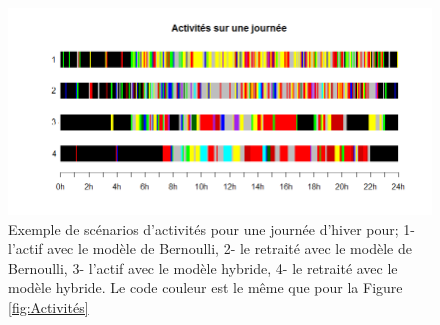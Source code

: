\begin{figure}[H]
\centering
\includegraphics[scale=0.7]{Images/Activites/ActivitesSurUneJournee}
\caption{Exemple de scénarios d'activités pour une journée d'hiver pour; 1- l'actif avec le modèle de Bernoulli, 2- le retraité avec le modèle de Bernoulli, 3- l'actif avec le modèle hybride, 4- le retraité avec le modèle hybride. Le code couleur est le même que pour la Figure \ref{fig:Activités}}
\label{fig:ExempleScenario}
\end{figure}

